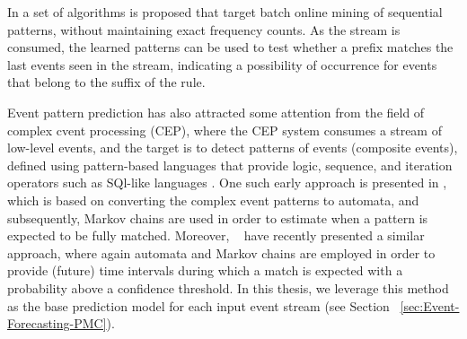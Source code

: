 \par In \cite{zhou_pattern_2015} a set of algorithms is proposed that target batch online mining of sequential patterns, without maintaining exact frequency counts. As the stream is consumed, the learned patterns can be used to test whether a prefix matches the last events seen in the stream, indicating a possibility of occurrence for events that belong to the suffix of the rule.

\par Event pattern prediction has also attracted some attention from the field of complex cvent processing (CEP), where the CEP system consumes a stream of low-level events, and the target is to detect patterns of events (composite events), defined using pattern-based languages that provide logic, sequence, and iteration operators such as SQl-like languages \cite{Cugola:2012:PFI:2187671.2187677}. One such early approach is presented in \cite{muthusamy_predictive_2010}, which is based on converting the complex event patterns to automata, and subsequently, Markov chains are used in order to estimate when a pattern is expected to be fully matched. Moreover, ~\citet{alevizos2017event} have recently presented a similar approach, where again automata and Markov chains are employed in order to provide (future) time intervals during which a match is expected with a probability above a confidence threshold. In this thesis, we leverage this method as the base prediction model for each input event stream (see Section ~\ref{sec:Event-Forecasting-PMC}). 